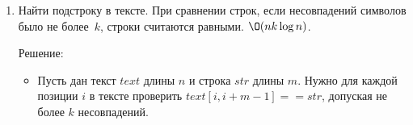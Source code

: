 \begin{enumerate}
\begin{itemize}
      \item Определим массив $postfixCount$:
      
      $postfixCount[i] = $ максимальное число последовательных единиц в
      $blocks[i], $ \newline $ blocks[i+k], blocks[i+2k], \ldots$
      
      $$postfixCount[i] = \begin{cases} 0, & \text{если } blocks[i] = 0 \text{ или } i > n - 2k \\ postfixCount[i + k] + 1, & \text{если } blocks[i] = 1 \end{cases}$$

      Пройдемся по строке справа налево и вычислим $postfixCount[i]$ по формуле выше за $\O(n)$.

      \item Тогда для начальной позиции $i$ максимальное число копий $x = s[i, i+k-1]$ равно $postfixCount[i] + 1$,
      
      а длина соответствующей подстроки равна $(postfixCount[i] + 1) \cdot k$.

      \item Ответ:
      $$\max_{0 \leq i \leq n - k} (postfixCount[i] + 1) \cdot k$$

      \item Сложность по времени:
      \begin{itemize}
        \item Предподсчёт хешей: $\O(n)$
        \item Вычисление массива $blocks$: $\O(n)$
        \item Вычисление массива $postfixCount$: $\O(n)$
        \item Поиск максимума: $\O(n)$
      \end{itemize}

      Итого: $\O(n)$

      \item Сложность по памяти: $\O(n)$ -- массивы хешей, $blocks$, $postfixCount$.

    \end{itemize}

  \item
    Найти подстроку в тексте. При сравнении строк, если несовпадений символов было не более~$k$, строки считаются равными. $\O(nk \log n)$.

    Решение:

    \begin{itemize}
      \item Пусть дан текст $text$ длины $n$ и строка $str$ длины $m$.
      Нужно для каждой позиции $i$ в тексте проверить $text[i, i+m-1] == str$, допуская не более $k$ несовпадений.


\end{itemize}
\end{enumerate}
